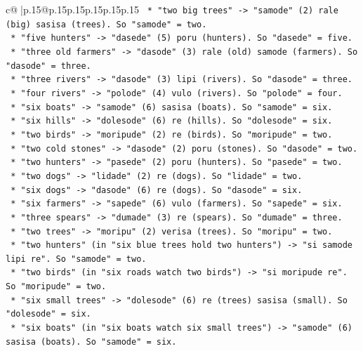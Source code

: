\documentclass{article}
\begin{document}
{\begin{supertabular}{c@{$\;$}|p{.15\linewidth}@{}p{.15\linewidth}p{.15\linewidth}p{.15\linewidth}p{.15\linewidth}p{.15\linewidth}}
{{{\texttt{        *   "two big trees" {-}> "samode" (2) rale (big) sasisa (trees). So "samode" = two.} \\
\texttt{        *   "five hunters" {-}> "dasede" (5) poru (hunters). So "dasede" = five.} \\
\texttt{        *   "three old farmers" {-}> "dasode" (3) rale (old) samode (farmers). So "dasode" = three.} \\
\texttt{        *   "three rivers" {-}> "dasode" (3) lipi (rivers). So "dasode" = three.} \\
\texttt{        *   "four rivers" {-}> "polode" (4) vulo (rivers). So "polode" = four.} \\
\texttt{        *   "six boats" {-}> "samode" (6) sasisa (boats). So "samode" = six.} \\
\texttt{        *   "six hills" {-}> "dolesode" (6) re (hills). So "dolesode" = six.} \\
\texttt{        *   "two birds" {-}> "moripude" (2) re (birds). So "moripude" = two.} \\
\texttt{        *   "two cold stones" {-}> "dasode" (2) poru (stones). So "dasode" = two.} \\
\texttt{        *   "two hunters" {-}> "pasede" (2) poru (hunters). So "pasede" = two.} \\
\texttt{        *   "two dogs" {-}> "lidade" (2) re (dogs). So "lidade" = two.} \\
\texttt{        *   "six dogs" {-}> "dasode" (6) re (dogs). So "dasode" = six.} \\
\texttt{        *   "six farmers" {-}> "sapede" (6) vulo (farmers). So "sapede" = six.} \\
\texttt{        *   "three spears" {-}> "dumade" (3) re (spears). So "dumade" = three.} \\
\texttt{        *   "two trees" {-}> "moripu" (2) verisa (trees). So "moripu" = two.} \\
\texttt{        *   "two hunters" (in "six blue trees hold two hunters") {-}> "si samode lipi re". So "samode" = two.} \\
\texttt{        *   "two birds" (in "six roads watch two birds") {-}> "si moripude re". So "moripude" = two.} \\
\texttt{        *   "six small trees" {-}> "dolesode" (6) re (trees) sasisa (small). So "dolesode" = six.} \\
\texttt{        *   "six boats" (in "six boats watch six small trees") {-}> "samode" (6) sasisa (boats). So "samode" = six.} \\
}}}
\end{supertabular}}
\end{document}
